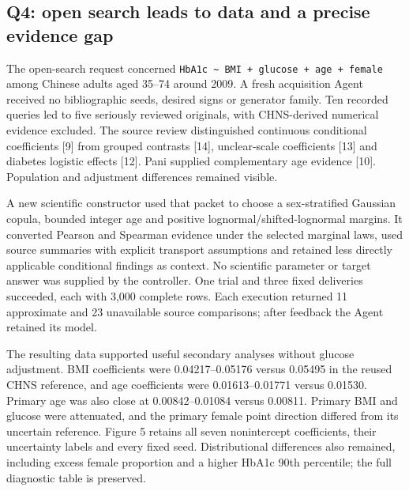 \documentclass[10pt,twocolumn]{article}
\begin{document}
\subsection{Q4: open search leads to data and a precise evidence gap}

The open-search request concerned \texttt{HbA1c \textasciitilde{} BMI + glucose + age + female} among Chinese adults aged 35–74 around 2009. A fresh acquisition Agent received no bibliographic seeds, desired signs or generator family. Ten recorded queries led to five seriously reviewed originals, with CHNS-derived numerical evidence excluded. The source review distinguished continuous conditional coefficients [9] from grouped contrasts [14], unclear-scale coefficients [13] and diabetes logistic effects [12]. Pani supplied complementary age evidence [10]. Population and adjustment differences remained visible.


A new scientific constructor used that packet to choose a sex-stratified Gaussian copula, bounded integer age and positive lognormal/shifted-lognormal margins. It converted Pearson and Spearman evidence under the selected marginal laws, used source summaries with explicit transport assumptions and retained less directly applicable conditional findings as context. No scientific parameter or target answer was supplied by the controller. One trial and three fixed deliveries succeeded, each with 3,000 complete rows. Each execution returned 11 approximate and 23 unavailable source comparisons; after feedback the Agent retained its model.


The resulting data supported useful secondary analyses without glucose adjustment. BMI coefficients were 0.04217–0.05176 versus 0.05495 in the reused CHNS reference, and age coefficients were 0.01613–0.01771 versus 0.01530. Primary age was also close at 0.00842–0.01084 versus 0.00811. Primary BMI and glucose were attenuated, and the primary female point direction differed from its uncertain reference. Figure 5 retains all seven nonintercept coefficients, their uncertainty labels and every fixed seed. Distributional differences also remained, including excess female proportion and a higher HbA1c 90th percentile; the full diagnostic table is preserved.
\end{document}
